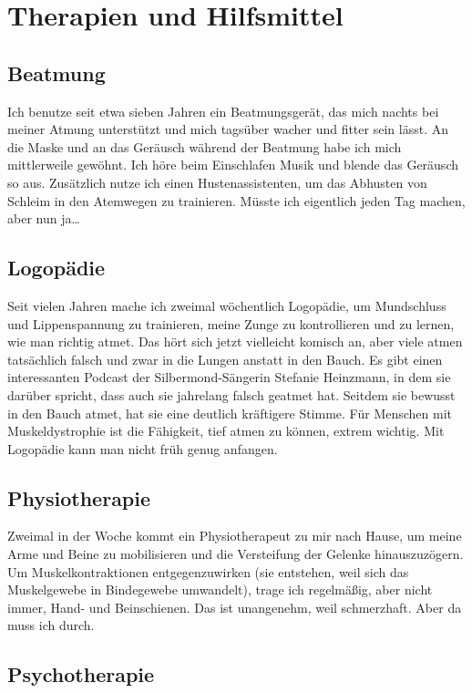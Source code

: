 \documentclass[fontsize=14pt,a4paper,headinclude,DIV=calc,automark]{scrbook}
\begin{document}
\section{Therapien und Hilfsmittel}

\subsection{Beatmung}

Ich benutze seit etwa sieben Jahren ein Beatmungsgerät, das mich nachts bei meiner Atmung unterstützt und mich tagsüber wacher und fitter sein lässt. An die Maske und an das Geräusch während der Beatmung habe ich mich mittlerweile gewöhnt. Ich höre beim Einschlafen Musik und blende das Geräusch so aus. Zusätzlich nutze ich einen Hustenassistenten, um das Abhusten von Schleim in den Atemwegen zu trainieren. Müsste ich eigentlich jeden Tag machen, aber nun ja…

\subsection{Logopädie}

Seit vielen Jahren mache ich zweimal wöchentlich Logopädie, um Mundschluss und Lippenspannung zu trainieren, meine Zunge zu kontrollieren und zu lernen, wie man richtig atmet. Das hört sich jetzt vielleicht komisch an, aber viele atmen tatsächlich falsch und zwar in die Lungen anstatt in den Bauch. Es gibt einen interessanten Podcast der Silbermond-Sängerin Stefanie Heinzmann, in dem sie darüber spricht, dass auch sie jahrelang falsch geatmet hat. Seitdem sie bewusst in den Bauch atmet, hat sie eine deutlich kräftigere Stimme. Für Menschen mit Muskeldystrophie ist die Fähigkeit, tief atmen zu können, extrem wichtig. Mit Logopädie kann man nicht früh genug anfangen.

\subsection{Physiotherapie}

Zweimal in der Woche kommt ein Physiotherapeut zu mir nach Hause, um meine Arme und Beine zu mobilisieren und die Versteifung der Gelenke hinauszuzögern. Um Muskelkontraktionen entgegenzuwirken (sie entstehen, weil sich das Muskelgewebe in Bindegewebe umwandelt), trage ich regelmäßig, aber nicht immer, Hand- und Beinschienen. Das ist unangenehm, weil schmerzhaft. Aber da muss ich durch.

\subsection{Psychotherapie}
\end{document}
